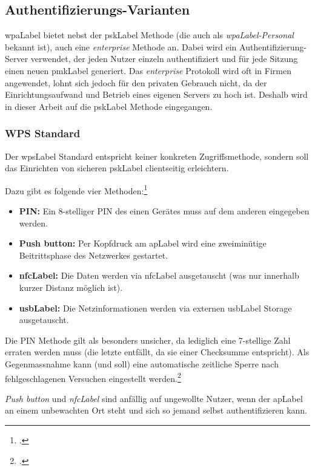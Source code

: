 \subsection{Authentifizierungs-Varianten}
\gls{wpaLabel} bietet nebst der \gls{pskLabel} Methode (die auch als \textit{\gls{wpaLabel}-Personal} bekannt ist), auch eine \textit{enterprise} Methode an.
Dabei wird ein Authentifizierung-Server verwendet, der jeden Nutzer einzeln authentifiziert und für jede Sitzung einen neuen \gls{pmkLabel} generiert.
Das \textit{enterprise} Protokoll wird oft in Firmen angewendet, lohnt sich jedoch für den privaten Gebrauch nicht, da der Einrichtungsaufwand und Betrieb eines eigenen Servers zu hoch ist.
Deshalb wird in dieser Arbeit auf die \gls{pskLabel} Methode eingegangen.


\subsubsection{WPS Standard}
Der \gls{wpsLabel} Standard entspricht keiner konkreten Zugriffsmethode, sondern soll das Einrichten von sicheren \gls{pskLabel} clientseitig erleichtern.

Dazu gibt es folgende vier Methoden:\footcite{Wi-Fi_Protected_Setup_-_Wikipedia_the_free_encyclopedia_2015-04-10}
\begin{itemize}
	\item \textbf{PIN:} Ein 8-stelliger PIN des einen Gerätes muss auf dem anderen eingegeben werden.
	\item \textbf{Push button:} Per Kopfdruck am \gls{apLabel} wird eine zweiminütige Beitrittsphase des Netzwerkes gestartet.
	\item \textbf{\gls{nfcLabel}:} Die Daten werden via \gls{nfcLabel} ausgetauscht (was nur innerhalb kurzer Distanz möglich ist).
	\item \textbf{\gls{usbLabel}:} Die Netzinformationen werden via externen \gls{usbLabel} Storage ausgetauscht.
\end{itemize}

Die PIN Methode gilt als besonders unsicher, da lediglich eine 7-stellige Zahl erraten werden muss (die letzte entfällt, da sie einer Checksumme entspricht).
Als Gegenmassnahme kann (und soll) eine automatische zeitliche Sperre nach fehlgeschlagenen Versuchen eingestellt werden.\footcite{viehboeck_wps_2015-04-10}

\textit{Push button} und \textit{\gls{nfcLabel}} sind anfällig auf ungewollte Nutzer, wenn der \gls{apLabel} an einem unbewachten Ort steht und sich so jemand selbst authentifizieren kann.


